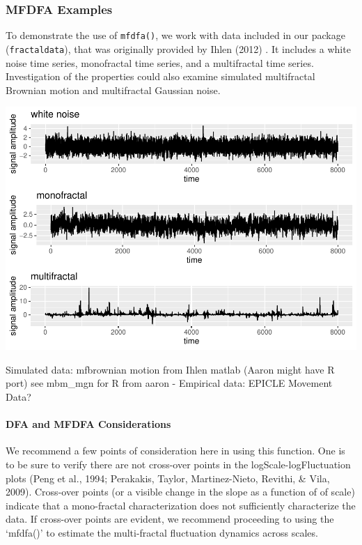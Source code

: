 \documentclass[
  english,
  man]{apa6}
\let\oldparagraph\paragraph
\renewcommand{\paragraph}[1]{\oldparagraph{#1}\mbox{}}
\begin{document}
\hypertarget{mfdfa-examples}{%
\subsubsection{MFDFA Examples}\label{mfdfa-examples}}

To demonstrate the use of \texttt{mfdfa()}, we work with data included in our
package (\texttt{fractaldata}), that was originally provided by
Ihlen (2012) . It includes a white noise
time series, monofractal time series, and a multifractal time series.
Investigation of the properties could also examine simulated
multifractal Brownian motion and multifractal Gaussian noise.

\includegraphics{fractal_regression_paper_brm_files/figure-latex/unnamed-chunk-4-1.pdf}

Simulated data: mfbrownian motion from Ihlen matlab (Aaron might have R
port) see mbm\_mgn for R from aaron - Empirical data: EPICLE Movement
Data?

\hypertarget{dfa-and-mfdfa-considerations}{%
\paragraph{DFA and MFDFA Considerations}\label{dfa-and-mfdfa-considerations}}

We recommend a few points of consideration here in using this function.
One is to be sure to verify there are not cross-over points in the
logScale-logFluctuation plots (Peng et al., 1994; Perakakis, Taylor, Martinez-Nieto, Revithi, \& Vila, 2009). Cross-over points (or a visible change in the slope as
a function of of scale) indicate that a mono-fractal characterization
does not sufficiently characterize the data. If cross-over points are
evident, we recommend proceeding to using the `mfdfa()' to estimate the
multi-fractal fluctuation dynamics across scales.
\end{document}
